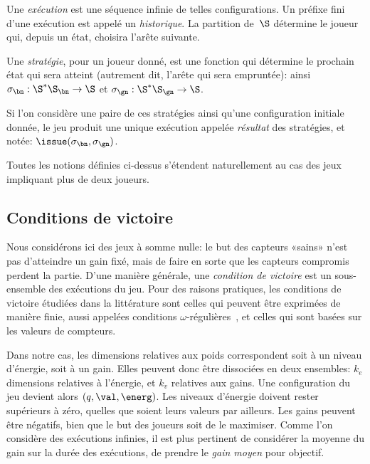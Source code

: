 Une \emph{exécution} est une séquence infinie de telles configurations.
Un préfixe fini d'une exécution est appelé un \emph{historique}.
La partition de~$\S$ détermine le joueur qui, depuis un état, choisira l'arête suivante.

Une \emph{stratégie}, pour un joueur donné, est une fonction qui détermine le prochain état qui sera atteint (autrement dit, l'arête qui sera empruntée): ainsi $\sigma_\bn: \S^* \S_\bn \rightarrow \S$ et $\sigma_\gn: \S^* \S_\gn \rightarrow \S$.

Si l'on considère une paire de ces stratégies ainsi qu'une configuration initiale donnée, le jeu produit une unique exécution appelée \emph{résultat} des stratégies, et notée: $\issue(\sigma_\bn,\sigma_\gn)$.

\begin{remark}
Toutes les notions définies ci-dessus s'étendent naturellement au cas des jeux impliquant plus de deux joueurs.
\end{remark}

\subsection{Conditions de victoire}

Nous considérons ici des jeux à somme nulle: le but des capteurs «sains» n'est pas d'atteindre un gain fixé, mais de faire en sorte que les capteurs compromis perdent la partie.
D'une manière générale, une \emph{condition de victoire} est un sous-ensemble des exécutions du jeu.
Pour des raisons pratiques, les conditions de victoire étudiées dans la littérature sont celles qui peuvent être exprimées de manière finie, aussi appelées conditions $\omega$-régulières~\cite{GTW02}, et celles qui sont basées sur les valeurs de compteurs.

Dans notre cas, les dimensions relatives aux poids correspondent soit à un niveau d'énergie, soit à un gain.
Elles peuvent donc être dissociées en deux ensembles: $k_e$ dimensions relatives à l'énergie, et $k_v$ relatives aux gains.
Une configuration du jeu devient alors $(q,\val,\energ)$.
Les niveaux d'énergie doivent rester supérieurs à zéro, quelles que soient leurs valeurs par ailleurs.
Les gains peuvent être négatifs, bien que le but des joueurs soit de le maximiser.
Comme l'on considère des exécutions infinies, il est plus pertinent de considérer la moyenne du gain sur la durée des exécutions, \cad de prendre le \emph{gain moyen} pour objectif.

